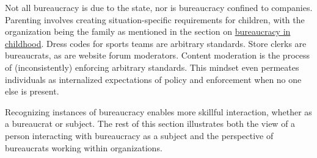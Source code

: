 Not all bureaucracy is due to the state, nor is bureaucracy confined to companies. Parenting involves creating situation-specific requirements for children, with the organization being the family as mentioned in the section 
on \hyperref[sec:bureaucracy-early-childhood]{bureaucracy in childhood}.
Dress codes for sports teams are arbitrary standards. 
Store clerks are bureaucrats, as are website forum moderators.  Content moderation is the process of (inconsistently) enforcing arbitrary standards. This mindset even permeates individuals as internalized expectations of policy and enforcement when no one else is present. 

Recognizing instances of bureaucracy enables more skillful interaction, whether as a bureaucrat or subject. The rest of this section illustrates both the view of a person interacting with bureaucracy as a \gls{subject} and the perspective of bureaucrats working within organizations. 




